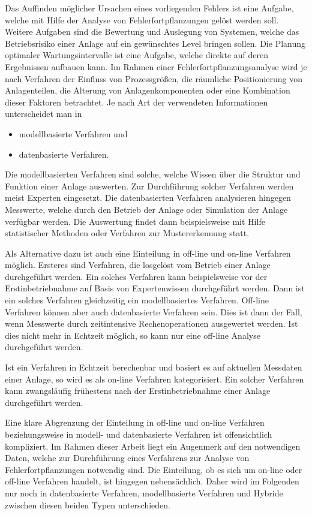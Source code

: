Das Auffinden m\"oglicher Ursachen eines vorliegenden Fehlers ist eine Aufgabe, welche mit Hilfe der Analyse von Fehlerfortpflanzungen gel\"ost werden soll. Weitere Aufgaben sind die Bewertung und Auslegung von Systemen, welche das Betriebsrisiko einer Anlage auf ein gew\"unschtes Level bringen sollen. Die Planung optimaler Wartungsintervalle ist eine Aufgabe, welche direkte auf deren Ergebnissen aufbauen kann. \linebreak
Im Rahmen einer Fehlerfortpflanzungsanalyse wird je nach Verfahren der Einfluss von Prozessgr\"o\ss{}en, die r\"aumliche Positionierung von Anlagenteilen, die Alterung von Anlagenkomponenten oder eine Kombination dieser Faktoren betrachtet. Je nach Art der verwendeten Informationen unterscheidet man in \begin{itemize}
\item modellbasierte Verfahren und
\item datenbasierte Verfahren. 
\end{itemize} Die modellbasierten Verfahren sind solche, welche Wissen \"uber die Struktur und Funktion einer Anlage auswerten. Zur Durchf\"uhrung solcher Verfahren werden meist Experten eingesetzt. Die datenbasierten Verfahren analysieren hingegen Messwerte, welche durch den Betrieb der Anlage oder Simulation der Anlage verf\"ugbar werden. Die Auswertung findet dann beispielsweise mit Hilfe statistischer Methoden oder Verfahren zur Mustererkennung statt. 

Als Alternative dazu ist auch eine Einteilung in off-line und on-line Verfahren m\"oglich. Ersteres sind Verfahren, die losgel\"ost vom Betrieb einer Anlage durchgef\"uhrt werden. Ein solches Verfahren kann beispielsweise vor der Erstinbetriebnahme auf Basis von Expertenwissen durchgef\"uhrt werden. Dann ist ein solches Verfahren gleichzeitig ein modellbasiertes Verfahren. Off-line Verfahren k\"onnen aber auch datenbasierte Verfahren sein. Dies ist dann der Fall, wenn Messwerte durch zeitintensive Rechenoperationen ausgewertet werden. Ist dies nicht mehr in Echtzeit m\"oglich, so kann nur eine off-line Analyse durchgef\"uhrt werden.

Ist ein Verfahren in Echtzeit berechenbar und basiert es auf aktuellen Messdaten einer Anlage, so wird es als on-line Verfahren kategorisiert. Ein solcher Verfahren kann zwangsl\"aufig fr\"uhestens nach der Erstinbetriebnahme einer Anlage durchgef\"uhrt werden. 

Eine klare Abgrenzung der Einteilung in off-line und on-line Verfahren beziehungsweise in modell- und datenbasierte Verfahren ist offensichtlich kompliziert. Im Rahmen dieser Arbeit liegt ein Augenmerk auf den notwendigen Daten, welche zur Durchf\"uhrung eines Verfahrens zur Analyse von Fehlerfortpflanzungen notwendig sind. Die Einteilung, ob es sich um on-line oder off-line Verfahren handelt, ist hingegen nebens\"achlich. Daher wird im Folgenden nur noch in datenbasierte Verfahren, modellbasierte Verfahren und Hybride zwischen diesen beiden Typen unterschieden. 
  
